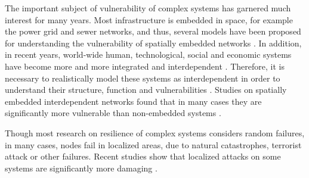 \documentclass[twocolumn,noshowpacs,pre,preprintnumbers,superscriptaddress,amsmath,amssymb,floatfix]{revtex4}
\begin{document}
	The important subject of vulnerability of complex systems has garnered much interest for many years.
	Most infrastructure is embedded in space, for example the power grid and sewer networks, and thus, several models have been proposed for understanding the vulnerability of spatially embedded networks
	\cite{doar1993bad,wei1993comparison,zegura1997quantitative, watts-nature1998,penrose2003random,kleinberg2000small,kosmidis-epl2008,li-naturephysics2011,mcandrew-pre2015}.
	In addition, in recent years, world-wide human, technological, social and economic systems have become more and more integrated and interdependent \cite{peerenboom-proceedings2001,rinaldi-ieee2001,rosato-criticalinf2008,bookstaber-ofr2016,majdandzic-naturecomm2016,li-preprint2014}.
	Therefore, it is necessary to realistically model these systems as interdependent in order to understand their structure, function and vulnerabilities \cite{buldyrev-nature2010,gao-naturephysics2012,gao-prl2011,baxter-prl2012,kivela-jcomnets2014,dedomenico-prx2013,bianconi-pre2013,boccaletti-physicsreports2014,gao-nationalscirev2014,cai-naturephysics2015,hu-prx2014,danziger-collection2016}.
	Studies on spatially embedded interdependent networks found that in many cases they are significantly more vulnerable than non-embedded systems \cite{barthelemy-physicsreports2011,bashan-naturephysics2013,wei-prl2012,danziger-jcomnets2014,boccaletti-physicsreports2014,shekhtman-pre2014,asztalos-plosone2014,danziger-newjphysics2015,lee-epjb2015}.
	
	Though most research on resilience of complex systems considers random failures, in many cases, nodes fail in localized areas, due to natural catastrophes, terrorist attack or other failures.
	Recent studies show that localized attacks on some systems are significantly more damaging
	\cite{neumayer-milcom2008,agarwal-infocom2011,berezin-scireports2015,shao-njp2015,yuan-pre2015,yuan-pre2016,yan-springerbook2016,hu-scireports2016,wu-eng2016,ouyang-eng2016}.
	
\end{document}
